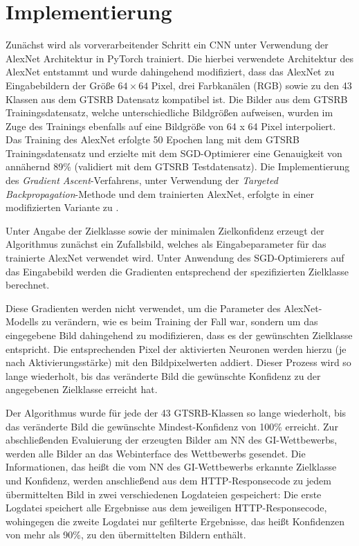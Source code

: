 \section{Implementierung}

Zunächst wird als vorverarbeitender Schritt ein \ac{CNN} unter Verwendung der AlexNet Architektur in PyTorch trainiert. 
Die hierbei verwendete Architektur des AlexNet entstammt \cite{pytorch_datasets_2019} und wurde dahingehend modifiziert, dass das AlexNet zu Eingabebildern der Größe $64 \times 64$ Pixel, drei Farbkanälen (RGB) sowie zu den 43 Klassen aus dem \ac{GTSRB} Datensatz kompatibel ist. 
Die Bilder aus dem \ac{GTSRB} Trainingsdatensatz, welche unterschiedliche Bildgrößen aufweisen, wurden im Zuge des Trainings ebenfalls auf eine Bildgröße von 64 x 64 Pixel interpoliert. 
Das Training des AlexNet erfolgte 50 Epochen lang mit dem \ac{GTSRB} Trainingsdatensatz und erzielte mit dem \ac{SGD}-Optimierer eine Genauigkeit von annähernd 89\% (validiert mit dem \ac{GTSRB} Testdatensatz).
Die Implementierung des \textit{Gradient Ascent}-Verfahrens, unter Verwendung der \textit{Targeted Backpropagation}-Methode und dem trainierten AlexNet, erfolgte in einer modifizierten Variante zu \cite{ozbulak_pytorch_2019}. 

Unter Angabe der Zielklasse sowie der minimalen Zielkonfidenz erzeugt der Algorithmus zunächst ein Zufallsbild, welches als Eingabeparameter für das trainierte AlexNet verwendet wird. Unter Anwendung des SGD-Optimierers auf das Eingabebild werden die Gradienten entsprechend der spezifizierten Zielklasse berechnet. 

Diese Gradienten werden nicht verwendet, um die Parameter des AlexNet-Modells zu verändern, wie es beim Training der Fall war, sondern um das eingegebene Bild dahingehend zu modifizieren, dass es der gewünschten Zielklasse entspricht. 
Die entsprechenden Pixel der aktivierten Neuronen werden hierzu (je nach Aktivierungsstärke) mit den Bildpixelwerten addiert. 
Dieser Prozess wird so lange wiederholt, bis das veränderte Bild die gewünschte Konfidenz zu der angegebenen Zielklasse erreicht hat.

Der Algorithmus wurde für jede der 43 \ac{GTSRB}-Klassen so lange wiederholt, bis das veränderte Bild die gewünschte Mindest-Konfidenz von 100\% erreicht.
Zur abschließenden Evaluierung der erzeugten Bilder am \ac{NN} des \ac{GI}-Wettbewerbs, werden alle Bilder an das Webinterface des Wettbewerbs gesendet. Die Informationen, das heißt die vom \ac{NN} des \ac{GI}-Wettbewerbs erkannte Zielklasse und Konfidenz, werden anschließend aus dem HTTP-Responsecode zu jedem übermittelten Bild in zwei verschiedenen Logdateien gespeichert: Die erste Logdatei speichert alle Ergebnisse aus dem jeweiligen HTTP-Responsecode, wohingegen die zweite Logdatei nur gefilterte Ergebnisse, das heißt Konfidenzen von mehr als 90\%, zu den übermittelten Bildern enthält.


